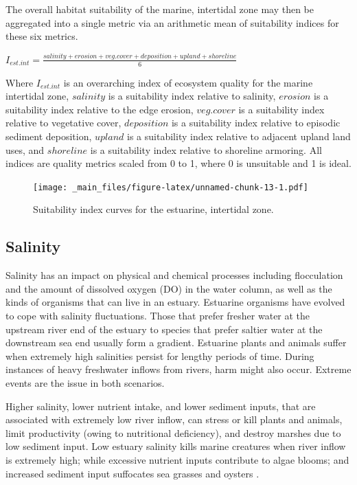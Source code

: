 \documentclass[
]{book}
\begin{document}
The overall habitat suitability of the marine, intertidal zone may then be aggregated into a single metric via an arithmetic mean of suitability indices for these six metrics.

\(I_{est.int} = \frac{salinity + erosion + veg.cover + deposition + upland + shoreline}{6}\)

Where \(I_{est.int}\) is an overarching index of ecosystem quality for the marine intertidal zone, \(salinity\) is a suitability index relative to salinity, \(erosion\) is a suitability index relative to the edge erosion, \(veg.cover\) is a suitability index relative to vegetative cover, \(deposition\) is a suitability index relative to episodic sediment deposition, \(upland\) is a suitability index relative to adjacent upland land uses, and \(shoreline\) is a suitability index relative to shoreline armoring. All indices are quality metrics scaled from 0 to 1, where 0 is unsuitable and 1 is ideal.

\begin{figure}
\centering
\texttt{[image: \_main\_files/figure-latex/unnamed-chunk-13-1.pdf]}
\caption{\label{fig:unnamed-chunk-13}Suitability index curves for the estuarine, intertidal zone.}
\end{figure}

\hypertarget{salinity-1}{%
\subsection{Salinity}\label{salinity-1}}

Salinity has an impact on physical and chemical processes including flocculation and the amount of dissolved oxygen (DO) in the water column, as well as the kinds of organisms that can live in an estuary. Estuarine organisms have evolved to cope with salinity fluctuations. Those that prefer fresher water at the upstream river end of the estuary to species that prefer saltier water at the downstream sea end usually form a gradient. Estuarine plants and animals suffer when extremely high salinities persist for lengthy periods of time. During instances of heavy freshwater inflows from rivers, harm might also occur. Extreme events are the issue in both scenarios.

Higher salinity, lower nutrient intake, and lower sediment inputs, that are associated with extremely low river inflow, can stress or kill plants and animals, limit productivity (owing to nutritional deficiency), and destroy marshes due to low sediment input. Low estuary salinity kills marine creatures when river inflow is extremely high; while excessive nutrient inputs contribute to algae blooms; and increased sediment input suffocates sea grasses and oysters \citep{hopkinson_lateral_2018}.
\end{document}
